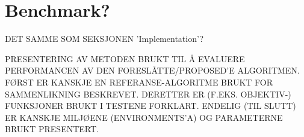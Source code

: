 \section*{Benchmark?}
	DET SAMME SOM SEKSJONEN 'Implementation'?
	\nl
	
	PRESENTERING AV METODEN BRUKT TIL Å EVALUERE PERFORMANCEN AV DEN FORESLÅTTE/PROPOSED'E ALGORITMEN. FØRST ER KANSKJE EN REFERANSE-ALGORITME BRUKT FOR SAMMENLIKNING BESKREVET. DERETTER ER (F.EKS. OBJEKTIV-) FUNKSJONER BRUKT I TESTENE FORKLART. ENDELIG (TIL SLUTT) ER KANSKJE MILJØENE (ENVIRONMENTS'A) OG PARAMETERNE BRUKT PRESENTERT.